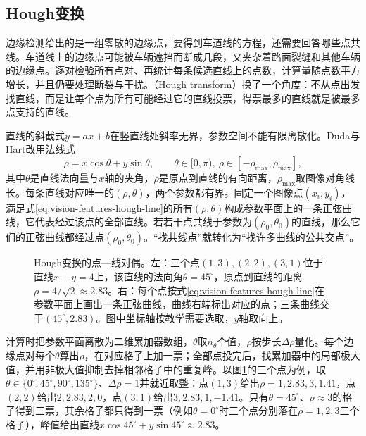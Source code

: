 \subsection{Hough变换}
\label{sec:vision-features-hough}

边缘检测给出的是一组零散的边缘点，要得到车道线的方程，还需要回答哪些点共线。车道线上的边缘点可能被车辆遮挡而断成几段，又夹杂着路面裂缝和其他车辆的边缘点。逐对检验所有点对、再统计每条候选直线上的点数，计算量随点数平方增长，并且仍要处理断裂与干扰。（Hough transform）换了一个角度：不从点出发找直线，而是让每个点为所有可能经过它的直线投票，得票最多的直线就是被最多点支持的直线。

直线的斜截式$y=ax+b$在竖直线处斜率无界，参数空间不能有限离散化。Duda与Hart改用法线式
\begin{equation}
  \rho=x\cos\theta+y\sin\theta,\qquad \theta\in[0,\pi),\ \rho\in[-\rho_{\max},\rho_{\max}],
  \label{eq:vision-features-hough-line}
\end{equation}
其中$\theta$是直线法向量与$x$轴的夹角，$\rho$是原点到直线的有向距离，$\rho_{\max}$取图像对角线长。每条直线对应唯一的$(\rho,\theta)$，两个参数都有界。固定一个图像点$(x_i,y_i)$，满足式\eqref{eq:vision-features-hough-line}的所有$(\rho,\theta)$构成参数平面上的一条正弦曲线，它代表经过该点的全部直线。若若干点共线于参数为$(\rho_0,\theta_0)$的直线，那么它们的正弦曲线都经过点$(\rho_0,\theta_0)$。“找共线点”就转化为“找许多曲线的公共交点”。

\begin{figure}[htbp]
  \centering
  
  \caption{Hough变换的点—线对偶。左：三个点$(1,3),(2,2),(3,1)$位于直线$x+y=4$上，该直线的法向角$\theta=45^\circ$，原点到直线的距离$\rho=4/\sqrt2\approx2.83$。右：每个点按式\eqref{eq:vision-features-hough-line}在参数平面上画出一条正弦曲线，曲线右端标出对应的点；三条曲线交于$(45^\circ,2.83)$。图中坐标轴按教学需要选取，$y$轴取向上。}
  \label{fig:vision-features-hough}
\end{figure}

计算时把参数平面离散为二维累加器数组，$\theta$取$n_{\theta}$个值，$\rho$按步长$\Delta\rho$量化。每个边缘点对每个$\theta$算出$\rho$，在对应格子上加一票；全部点投完后，找累加器中的局部极大值，并用非极大值抑制去掉相邻格子中的重复峰。以图\ref{fig:vision-features-hough}的三个点为例，取$\theta\in\{0^\circ,45^\circ,90^\circ,135^\circ\}$、$\Delta\rho=1$并就近取整：点$(1,3)$给出$\rho=1,2.83,3,1.41$，点$(2,2)$给出$2,2.83,2,0$，点$(3,1)$给出$3,2.83,1,-1.41$。只有$\theta=45^\circ$、$\rho\approx3$的格子得到三票，其余格子都只得到一票（例如$\theta=0^\circ$时三个点分别落在$\rho=1,2,3$三个格子），峰值给出直线$x\cos45^\circ+y\sin45^\circ\approx2.83$。

